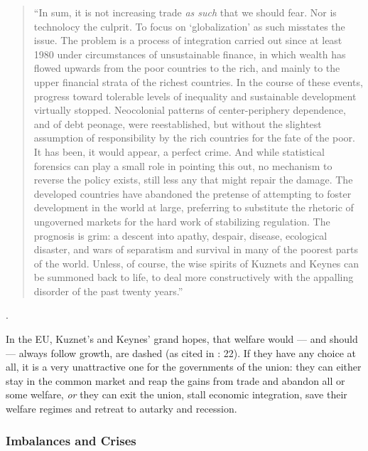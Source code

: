 \documentclass[11pt,a4paper,oneside,openright]{article}
\begin{document}
{\begin{quote}
		``In sum, it is not increasing trade \emph{as such} that we should fear. Nor is technolocy the culprit. To focus on `globalization' as such misstates the issue. The problem is a process of integration carried out since at least 1980 under circumstances of unsustainable finance, in which wealth has flowed upwards from the poor countries to the rich, and mainly to the upper financial strata of the richest countries. In the course of these events, progress toward tolerable levels of inequality and sustainable development virtually stopped. Neocolonial patterns of center-periphery dependence, and of debt peonage, were reestablished, but without the slightest assumption of responsibility by the rich countries for the fate of the poor. It has been, it would appear, a perfect crime. And while statistical forensics can play a small role in pointing this out, no mechanism to reverse the policy exists, still less any that might repair the damage. The developed countries have abandoned the pretense of attempting to foster development in the world at large, preferring to substitute the rhetoric of ungoverned markets for the hard work of stabilizing regulation. The prognosis is grim: a descent into apathy, despair, disease, ecological disaster, and wars of separatism and survival in many of the poorest parts of the world. Unless, of course, the wise spirits of Kuznets and Keynes can be summoned back to life, to deal more constructively with the appalling disorder of the past twenty years.''
	\end{quote}}.

In the \gls{EU}, Kuznet's and Keynes' grand hopes, that welfare would --- and should --- always follow growth, are dashed (as cited in \citealt{Galbraith2002a}: 22). If they have any choice at all, it is a very unattractive one for the governments of the union: they can either stay in the common market and reap the gains from trade and abandon all or some welfare, \emph{or} they can exit the union, stall economic integration, save their welfare regimes and retreat to autarky and recession.

\subsubsection{Imbalances and Crises} 
\end{document}
